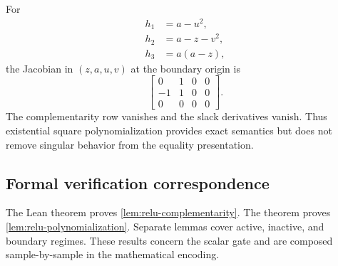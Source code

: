 For
\begin{align}
 h_1&=a-u^2,\\
 h_2&=a-z-v^2,\\
 h_3&=a(a-z),
\end{align}
the Jacobian in \((z,a,u,v)\) at the boundary origin is
\begin{equation}
  \begin{bmatrix}
   0&1&0&0\\
   -1&1&0&0\\
   0&0&0&0
  \end{bmatrix}.
\end{equation}
The complementarity row vanishes and the slack derivatives vanish.  Thus
existential square polynomialization provides exact semantics but does not
remove singular behavior from the equality presentation.

\subsection{Formal verification correspondence}

The Lean theorem
 proves
\cref{lem:relu-complementarity}.  The theorem
 proves
\cref{lem:relu-polynomialization}.  Separate lemmas cover active, inactive, and
boundary regimes.  These results concern the scalar gate and are composed
sample-by-sample in the mathematical encoding.
